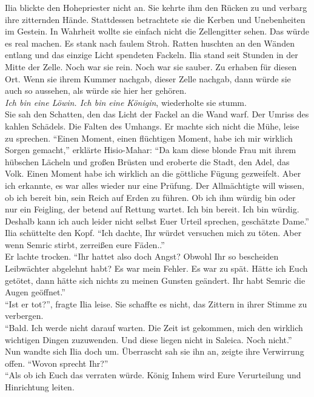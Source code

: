 Ilia blickte den Hohepriester nicht an. Sie kehrte ihm den Rücken zu und verbarg ihre zitternden 
Hände. Stattdessen betrachtete sie die Kerben und Unebenheiten im Gestein. In Wahrheit wollte sie 
einfach nicht die Zellengitter sehen. Das würde es real machen. Es stank nach faulem Stroh. Ratten 
huschten an den Wänden entlang und das einzige Licht spendeten Fackeln. Ilia stand seit Stunden in 
der Mitte der Zelle. Noch war sie rein. Noch war sie sauber. Zu erhaben für diesen Ort. Wenn sie 
ihrem Kummer nachgab, dieser Zelle nachgab, dann würde sie auch so aussehen, als würde sie hier her 
gehören.\\
\textit{Ich bin eine Löwin. Ich bin eine Königin}, wiederholte sie stumm.\\
Sie sah den Schatten, den das Licht der Fackel an die Wand warf. Der Umriss des kahlen Schädels. 
Die Falten des Umhangs. Er machte sich nicht die Mühe, leise zu sprechen. ``Einen Moment, einen 
flüchtigen Moment, habe ich mir wirklich Sorgen gemacht,'' erklärte Hisio-Mahar: ``Da kam diese 
blonde Frau mit ihrem hübschen Lächeln und großen Brüsten und eroberte die Stadt, den Adel, das 
Volk. Einen Moment habe ich wirklich an die göttliche Fügung gezweifelt. Aber ich erkannte, es war 
alles wieder nur eine Prüfung. Der Allmächtigte will wissen, ob ich bereit bin, sein Reich auf 
Erden zu führen. Ob ich ihm würdig bin oder nur ein Feigling, der betend auf Rettung wartet. Ich 
bin bereit. Ich bin würdig. Deshalb kann ich auch leider nicht selbst Euer Urteil sprechen, 
geschätzte Dame.''\\
Ilia schüttelte den Kopf. ``Ich dachte, Ihr würdet versuchen mich zu töten. Aber wenn Semric 
stirbt, zerreißen eure Fäden..''\\
Er lachte trocken. ``Ihr hattet also doch Angst? Obwohl Ihr so bescheiden Leibwächter abgelehnt 
habt? Es war mein Fehler. Es war zu spät. Hätte ich Euch getötet, dann hätte sich nichts zu meinen 
Gunsten geändert. Ihr habt Semric die Augen geöffnet.''\\
``Ist er tot?'', fragte Ilia leise. Sie schaffte es nicht, das Zittern in ihrer Stimme zu 
verbergen.\\
``Bald. Ich werde nicht darauf warten. Die Zeit ist gekommen, mich den wirklich wichtigen Dingen 
zuzuwenden. Und diese liegen nicht in Saleica. Noch nicht.''\\
Nun wandte sich Ilia doch um. Überrascht sah sie ihn an, zeigte ihre Verwirrung offen. ``Wovon 
sprecht Ihr?''\\
``Als ob ich Euch das verraten würde. König Inhem wird Eure Verurteilung und Hinrichtung leiten. 
